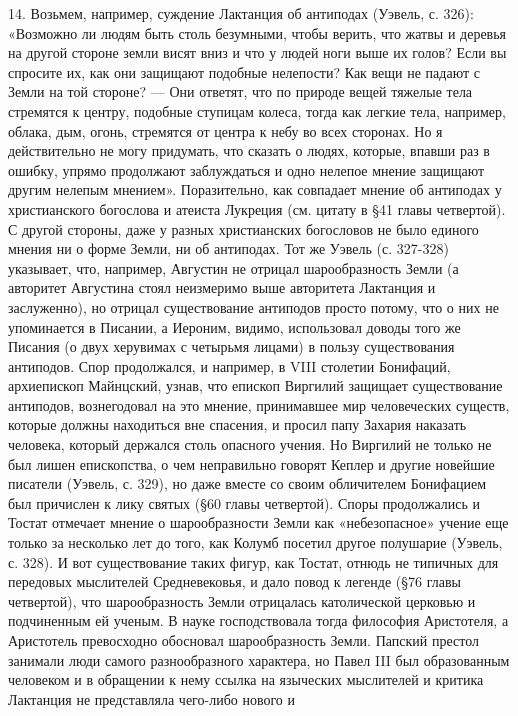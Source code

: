 14. Возьмем, например, суждение Лактанция об антиподах (Уэвель, с.
326): «Возможно ли людям быть столь безумными, чтобы верить, что жатвы
и деревья на другой стороне земли висят вниз и что у людей ноги выше
их голов? Если вы спросите их, как они защищают подобные нелепости?
Как вещи не падают с Земли на той стороне? --- Они ответят, что по
природе вещей тяжелые тела стремятся к центру, подобные ступицам
колеса, тогда как легкие тела, например, облака, дым, огонь, стремятся
от центра к небу во всех сторонах. Но я действительно не могу
придумать, что сказать о людях, которые, впавши раз в ошибку, упрямо
продолжают заблуждаться и одно нелепое мнение защищают другим нелепым
мнением». Поразительно, как совпадает мнение об антиподах у
христианского богослова и атеиста Лукреция (см. цитату в §41 главы
четвертой). С другой стороны, даже у разных христианских богословов не
было единого мнения ни о форме Земли, ни об антиподах. Тот же Уэвель
(с. 327-328) указывает, что, например, Августин не отрицал
шарообразность Земли (а авторитет Августина стоял неизмеримо выше
авторитета Лактанция и заслуженно), но отрицал существование антиподов
просто потому, что о них не упоминается в Писании, а Иероним, видимо,
использовал доводы того же Писания (о двух херувимах с четырьмя
лицами) в пользу существования антиподов. Спор продолжался, и
например, в VIII столетии Бонифаций, архиепископ Майнцский, узнав, что
епископ Виргилий защищает существование антиподов, вознегодовал на это
мнение, принимавшее мир человеческих существ, которые должны
находиться вне спасения, и просил папу Захария наказать человека,
который держался столь опасного учения. Но Виргилий не только не был
лишен епископства, о чем неправильно говорят Кеплер и другие новейшие
писатели (Уэвель, с. 329), но даже вместе со своим обличителем
Бонифацием был причислен к лику святых (§60 главы четвертой). Споры
продолжались и Тостат отмечает мнение о шарообразности Земли как
«небезопасное» учение еще только за несколько лет до того, как Колумб
посетил другое полушарие (Уэвель, с. 328). И вот существование таких
фигур, как Тостат, отнюдь не типичных для передовых мыслителей
Средневековья, и дало повод к легенде (§76 главы четвертой), что
шарообразность Земли отрицалась католической церковью и подчиненным ей
ученым. В науке господствовала тогда философия Аристотеля, а
Аристотель превосходно обосновал шарообразность Земли. Папский престол
занимали люди самого разнообразного характера, но Павел III был
образованным человеком и в обращении к нему ссылка на языческих
мыслителей и критика Лактанция не представляла чего-либо нового и
